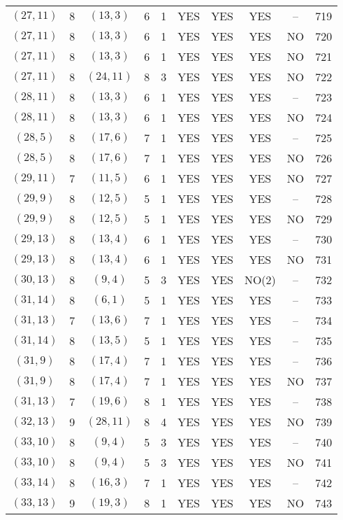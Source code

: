 \begin{longtable}{|c|c|c|c|c|c|c|c|c|c|}
$(27, 11)$ & 8 & $(13, 3)$ & 6 & 1 & YES & YES & YES & -- & 719\\
$(27, 11)$ & 8 & $(13, 3)$ & 6 & 1 & YES & YES & YES & NO & 720\\
$(27, 11)$ & 8 & $(13, 3)$ & 6 & 1 & YES & YES & YES & NO & 721\\
$(27, 11)$ & 8 & $(24, 11)$ & 8 & 3 & YES & YES & YES & NO & 722\\
$(28, 11)$ & 8 & $(13, 3)$ & 6 & 1 & YES & YES & YES & -- & 723\\
$(28, 11)$ & 8 & $(13, 3)$ & 6 & 1 & YES & YES & YES & NO & 724\\
$(28, 5)$ & 8 & $(17, 6)$ & 7 & 1 & YES & YES & YES & -- & 725\\
$(28, 5)$ & 8 & $(17, 6)$ & 7 & 1 & YES & YES & YES & NO & 726\\
$(29, 11)$ & 7 & $(11, 5)$ & 6 & 1 & YES & YES & YES & NO & 727\\
$(29, 9)$ & 8 & $(12, 5)$ & 5 & 1 & YES & YES & YES & -- & 728\\
$(29, 9)$ & 8 & $(12, 5)$ & 5 & 1 & YES & YES & YES & NO & 729\\
$(29, 13)$ & 8 & $(13, 4)$ & 6 & 1 & YES & YES & YES & -- & 730\\
$(29, 13)$ & 8 & $(13, 4)$ & 6 & 1 & YES & YES & YES & NO & 731\\
$(30, 13)$ & 8 & $(9, 4)$ & 5 & 3 & YES & YES & NO(2) & -- & 732\\
$(31, 14)$ & 8 & $(6, 1)$ & 5 & 1 & YES & YES & YES & -- & 733\\
$(31, 13)$ & 7 & $(13, 6)$ & 7 & 1 & YES & YES & YES & -- & 734\\
$(31, 14)$ & 8 & $(13, 5)$ & 5 & 1 & YES & YES & YES & -- & 735\\
$(31, 9)$ & 8 & $(17, 4)$ & 7 & 1 & YES & YES & YES & -- & 736\\
$(31, 9)$ & 8 & $(17, 4)$ & 7 & 1 & YES & YES & YES & NO & 737\\
$(31, 13)$ & 7 & $(19, 6)$ & 8 & 1 & YES & YES & YES & -- & 738\\
$(32, 13)$ & 9 & $(28, 11)$ & 8 & 4 & YES & YES & YES & NO & 739\\
$(33, 10)$ & 8 & $(9, 4)$ & 5 & 3 & YES & YES & YES & -- & 740\\
$(33, 10)$ & 8 & $(9, 4)$ & 5 & 3 & YES & YES & YES & NO & 741\\
$(33, 14)$ & 8 & $(16, 3)$ & 7 & 1 & YES & YES & YES & -- & 742\\
$(33, 13)$ & 9 & $(19, 3)$ & 8 & 1 & YES & YES & YES & NO & 743\\

\end{longtable}
